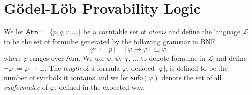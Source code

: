 \documentclass[copyright,creativecommons]{eptcs}
\newcommand{\treegl}{\mathsf{CSGL}}
\newcommand{\logicgl}{\mathsf{GL}}
\newcommand{\tim}[1]{{\color{blue}T:  #1 }}
\renewcommand{\phi}{\varphi}
\newcommand{\atm}{\mathsf{Atm}}
\newcommand{\lang}{\mathscr{L}}
\newcommand{\exptime}{\mathsf{EXPTIME}}
\newcommand{\sufo}{\mathsf{sufo}}
\begin{document}










\section{Gödel-Löb Provability Logic}\label{sec:prelims}



We let $\atm := \{p,q,r,\ldots\}$ be a countable set of \emph{atoms} and define the language $\lang$ to be the set of formulae generated by the following grammar in BNF:
$$
\phi ::= p \ |  \ \bot \ | \ \phi \rightarrow \phi \ | \ \Box \phi
$$
where $p$ ranges over $\atm$. We use $\phi$, $\psi$, $\chi$, $\ldots$ to denote formulae in $\lang$ and %
define $\neg \phi := \phi \rightarrow \bot$. %
The \emph{length} of a formula $\phi$, denoted $|\phi|$, is defined to be the number of symbols it contains and we let $\sufo(\phi)$ denote the set of all \emph{subformulae} of $\phi$, defined in the expected way.%
\end{document}
